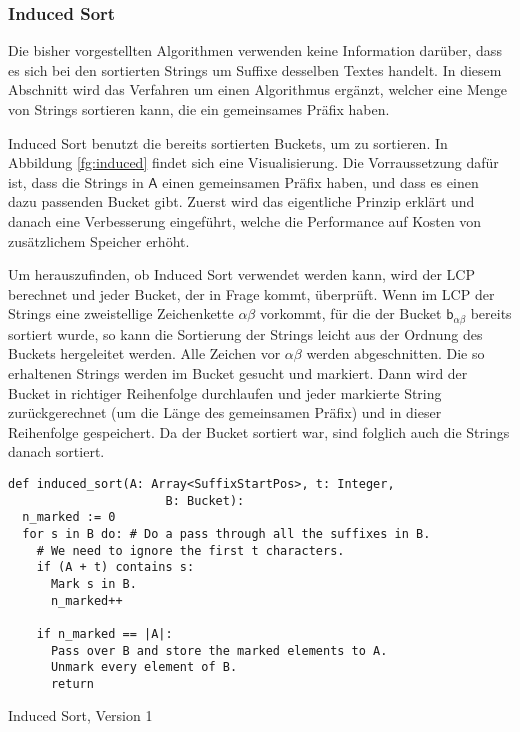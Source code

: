 \subsubsection{Induced Sort}
Die bisher vorgestellten Algorithmen verwenden keine Information darüber,
dass es sich bei den sortierten Strings um Suffixe desselben Textes handelt.
In diesem Abschnitt wird das Verfahren um einen Algorithmus ergänzt,
welcher eine Menge von Strings sortieren kann, die ein gemeinsames Präfix haben.

Induced Sort benutzt die bereits sortierten Buckets, um zu sortieren.
In Abbildung \ref{fg:induced} findet sich eine Visualisierung.
Die Vorraussetzung dafür ist, dass die Strings in $\mathsf{A}$ einen gemeinsamen Präfix haben,
und dass es einen dazu passenden Bucket gibt.
Zuerst wird das eigentliche Prinzip erklärt und danach eine Verbesserung eingeführt,
welche die Performance auf Kosten von zusätzlichem Speicher erhöht.

Um herauszufinden, ob Induced Sort verwendet werden kann, wird der LCP berechnet und jeder Bucket, der in Frage kommt, überprüft.
Wenn im LCP der Strings eine zweistellige Zeichenkette $\alpha\beta$ vorkommt,
für die der Bucket $\mathsf{b}_{\alpha\beta}$ bereits sortiert wurde,
so kann die Sortierung der Strings leicht aus der Ordnung des Buckets hergeleitet werden.
Alle Zeichen vor $\alpha\beta$ werden abgeschnitten.
Die so erhaltenen Strings werden im Bucket gesucht und markiert.
Dann wird der Bucket in richtiger Reihenfolge durchlaufen und jeder markierte String
zurückgerechnet (um die Länge des gemeinsamen Präfix) und in dieser Reihenfolge gespeichert.
Da der Bucket sortiert war, sind folglich auch die Strings danach sortiert.

\begin{listing}[!t]
\begin{verbatim}
def induced_sort(A: Array<SuffixStartPos>, t: Integer,
                      B: Bucket):
  n_marked := 0
  for s in B do: # Do a pass through all the suffixes in B.
    # We need to ignore the first t characters.
    if (A + t) contains s:
      Mark s in B.
      n_marked++

    if n_marked == |A|:
      Pass over B and store the marked elements to A.
      Unmark every element of B.
      return
\end{verbatim}
\caption{Induced Sort, Version 1~\cite{saca:4}}
\end{listing}

